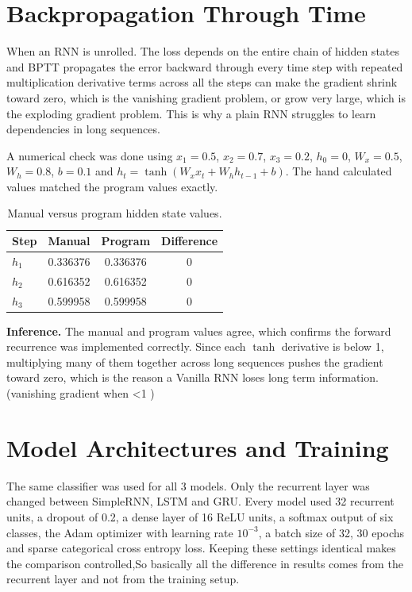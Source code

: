 \documentclass[12pt]{article}
\begin{document}
\section{Backpropagation Through Time}
When an RNN is unrolled. The loss depends on the entire chain of hidden states and BPTT propagates the error backward through every time step with repeated multiplication derivative terms across all the  steps can make the gradient shrink toward zero, which is the vanishing gradient problem, or grow very large, which is the exploding gradient problem. This is why a plain RNN struggles to learn  dependencies  in long sequences.

A numerical check was done using $x_1=0.5$, $x_2=0.7$, $x_3=0.2$, $h_0=0$, $W_x=0.5$, $W_h=0.8$, $b=0.1$ and $h_t = \tanh(W_x x_t + W_h h_{t-1} + b)$. The hand calculated values matched the program values exactly.

\begin{table}[H]
\centering
\caption{Manual versus program hidden state values.}
\begin{tabular}{@{}lccc@{}}
\toprule
Step & Manual & Program & Difference \\
\midrule
$h_1$ & 0.336376 & 0.336376 & $0$ \\
$h_2$ & 0.616352 & 0.616352 & $0$ \\
$h_3$ & 0.599958 & 0.599958 & $0$ \\
\bottomrule
\end{tabular}
\end{table}

\noindent\textbf{Inference.} The manual and program values agree, which confirms the forward recurrence was implemented correctly. Since each $\tanh$ derivative is below 1, multiplying many of them together across long sequences pushes the gradient toward zero, which is the reason a Vanilla RNN loses long term information.(vanishing gradient when <1 )

\section{Model Architectures and Training}
The same classifier was used for all 3 models. Only the recurrent layer was changed between SimpleRNN, LSTM and GRU. Every model used 32 recurrent units, a dropout of 0.2, a dense layer of 16 ReLU units, a softmax output of six classes, the Adam optimizer with learning rate $10^{-3}$, a batch size of 32, 30 epochs and sparse categorical cross entropy loss. Keeping these settings identical makes the comparison controlled,So basically all the difference in results comes from the recurrent layer and not from the training setup.
\end{document}
